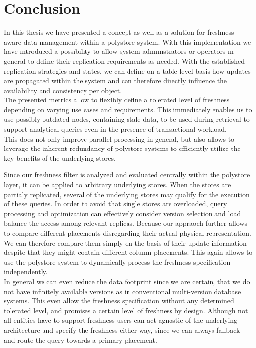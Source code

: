 \chapter{Conclusion}
\label{c:conclusion}

In this thesis we have presented a concept as well as a solution for freshness-aware data management within a polystore system.
With this implementation we have introduced a possibility to allow system administrators or operators in general to define their replication requirements as needed. 
With the established replication strategies and states, we can define on a table-level basis how updates are propagated within the system and can therefore directly influence 
the availability and consistency per object.\\
The presented metrics allow to flexibly define a tolerated level of freshness depending on varying use cases and requirements.
This immediately enables us to use possibly outdated nodes, containing stale data, to be used during retrieval to support analytical queries even in the presence of 
transactional workload.\\
This does not only improve parallel processing in general, but also allows to leverage the inherent redundancy of polystore systems
to efficiently utilize the key benefits of the underlying stores.\\



Since our freshness filter is analyzed and evaluated centrally within the polystore layer, it can be applied to arbitrary underlying stores.
When the stores are partialy replicated, several of the underlying stores may qualify for the execution of these queries. 
In order to avoid that single stores are overloaded, query processing and optimization
can effectively consider version selection and load balance the access among relevant replicas.
Because our appraoch further allows to compare different placements disregarding their actual physical representation. We can therefore compare them simply on the basis of their
update information despite that they might contain different column placements. 
This again allows to use the polystore system to dynamically process the freshness specification independently.\\
In general we can even reduce the data footprint since we are certain, that we do not have infinitely available versions as in conventional multi-version database systems.
This even allow the freshness specification without any determined tolerated level, and promises a certain level of freshness by design.
Although not all entities have to support freshness users can act agnostic of the underlying architecture and specify the freshness either way, 
since we can always fallback and route the query towards a primary placement.\\



